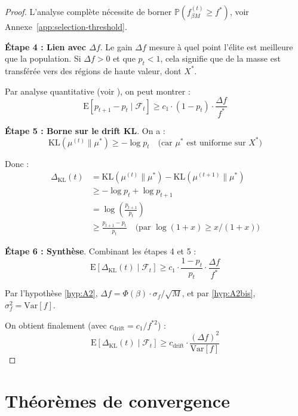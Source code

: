 \documentclass[12pt,a4paper]{article}
\theoremstyle{definition}
\theoremstyle{remark}
\newcommand{\E}{\text{E}}
\newcommand{\Var}{\text{Var}}
\newcommand{\KL}{\text{KL}}
\begin{document}
\begin{proof}
        L'analyse complète nécessite de borner $\mathbb{P}(f_{\beta M}^{(t)} \geq f^*)$, 
        voir Annexe~\ref{app:selection-threshold}.
		
		\textbf{Étape 4 : Lien avec $\Delta f$}.
		Le gain $\Delta f$ mesure à quel point l'élite est meilleure que la population. Si $\Delta f > 0$ et que $p_t < 1$, cela signifie que de la masse est transférée vers des régions de haute valeur, dont $X^*$.
		
		Par analyse quantitative (voir \cite{muhlenbein1999from}), on peut montrer :
		\begin{equation}
			\E[p_{t+1} - p_t \mid \mathcal{F}_t] \geq c_1 \cdot (1-p_t) \cdot \frac{\Delta f}{f^*}
		\end{equation}
		
		\textbf{Étape 5 : Borne sur le drift KL}.
		On a :
		\begin{equation}
			\KL(\mu^{(t)}\|\mu^*) \geq -\log p_t \quad \text{(car } \mu^* \text{ est uniforme sur } X^*)
		\end{equation}
		
		Donc :
		\begin{align}
			\Delta_{\KL}(t) &= \KL(\mu^{(t)}\|\mu^*) - \KL(\mu^{(t+1)}\|\mu^*) \\
			&\geq -\log p_t + \log p_{t+1} \\
			&= \log\left(\frac{p_{t+1}}{p_t}\right) \\
			&\geq \frac{p_{t+1} - p_t}{p_t} \quad \text{(par } \log(1+x) \geq x/(1+x))
		\end{align}
		
		\textbf{Étape 6 : Synthèse}.
		Combinant les étapes 4 et 5 :
		\begin{equation}
			\E[\Delta_{\KL}(t) \mid \mathcal{F}_t] \geq c_1 \cdot \frac{1-p_t}{p_t} \cdot \frac{\Delta f}{f^*}
		\end{equation}
		
		Par l'hypothèse \ref{hyp:A2}, $\Delta f = \Phi(\beta) \cdot \sigma_f / \sqrt{M}$, et par \ref{hyp:A2bis}, $\sigma_f^2 = \Var[f]$.
		
		On obtient finalement (avec $c_{\text{drift}} = c_1/f^{*2}$) :
		\begin{equation}
			\E[\Delta_{\KL}(t) \mid \mathcal{F}_t] \geq c_{\text{drift}} \cdot \frac{(\Delta f)^2}{\Var[f]}
		\end{equation}
	\end{proof}
	
    \section{Théorèmes de convergence}
	
\end{document}
